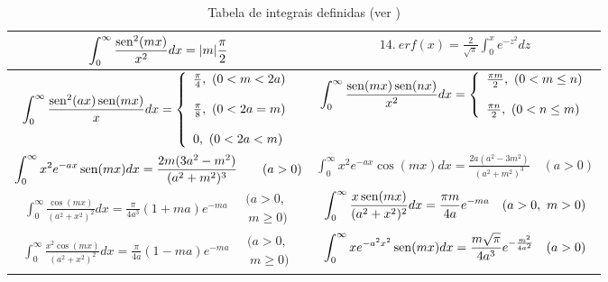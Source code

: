 \begin{table}
\begin{small}
\begin{center}
{\begin{tabular}{|c|c|}
$\displaystyle \int_0^\infty \frac{\operatorname{sen}^2(mx)}{x^2}dx=|m|\frac{\pi}{2} $& $\displaystyle 14.\ erf(x)=\frac{2}{\sqrt{\pi}}\int_0^x e^{-z^2}dz $ \\[2ex] \hline
$\displaystyle \int_0^\infty \frac{\sen^2(ax)\sen(mx)}{x}dx=\left\{\begin{array}{l}\frac{\pi }{4},\ (0<m<2a)\\\\\frac{\pi }{8},\ (0<2a=m)\\\\ 0,\ (0<2a<m) \end{array}\right. $& $\displaystyle \int_0^\infty \frac{\sen(mx)\sen(nx)}{x^2}dx=\left\{\begin{array}{l}\frac{\pi m}{2},\ (0<m\leq n)\\\\\frac{\pi n}{2},\ (0<n\leq m) \end{array}\right. $ \\[2ex] \hline
$\displaystyle \int_0^\infty x^2e^{-ax}\operatorname{sen}(mx)dx=\frac{2m(3a^2-m^2)}{(a^2+m^2)^3}\qquad (a>0) $& $\displaystyle \int_0^\infty x^2e^{-ax}\cos(mx)dx=\frac{2a(a^2-3m^2)}{(a^2+m^2)^3}\quad (a>0) $ \\[2ex] \hline
$\displaystyle \int_0^\infty \frac{\cos(mx)}{(a^2+x^2)^2}dx=\frac{\pi}{4a^3}(1+ma)e^{-ma}\quad \begin{array}{l}\!\!(a>0,\\ \ m\geq 0)\end{array} $& $\displaystyle \int_0^\infty \frac{x\operatorname{sen}(mx)}{(a^2+x^2)^2}dx=\frac{\pi m}{4a}e^{-ma} \quad (a>0,\ m>0) $ \\[2ex] \hline
$\displaystyle \int_0^\infty \frac{x^2\cos(mx)}{(a^2+x^2)^2}dx=\frac{\pi}{4a}(1-ma)e^{-ma}\quad \begin{array}{l}\!\!(a>0,\\ \ m\geq 0)\end{array} $& $\displaystyle \int_0^\infty xe^{-a^2x^2}\operatorname{sen}(mx)dx=\frac{ m \sqrt{\pi}}{4a^3}e^{-\frac{m^2}{4a^2}} \quad (a>0) $\\ \hline
\end{tabular}}

\caption{\label{tab_int_def}Tabela de integrais definidas (ver \cite{DWIGHT})}
\end{center}
\end{small}
\end{table}

